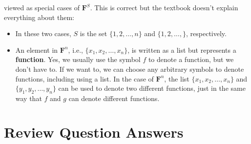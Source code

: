 \documentclass[12pt, letterpaper, oneside]{book}
\begin{document}
\begin{enumerate}
    viewed as special cases of $\mathbf{F}^S$. This is correct but the textbook
    doesn't explain everything about them:
    \begin{itemize}
      \item In these two cases, $S$ is the set $\{ 1, 2, \ldots, n \}$ and
      $\{ 1, 2, \ldots, \}$, respectively.
      \item An element in $\mathbf{F}^n$, i.e., $\{ x_1, x_2, \ldots, x_n \}$,
        is written as a list but represents a \textbf{function}. Yes, we
        usually use the symbol $f$ to denote a function, but we don't have to.
        If we want to, we can choose any arbitrary symbols to denote functions,
        including using a list. In the case of $\mathbf{F}^n$, the list
        $\{ x_1, x_2, \ldots, x_n \}$ and $\{ y_1, y_2, \ldots, y_n \}$ can be
        used to denote two different functions, just in the same way that $f$
        and $g$ can denote different functions.
    \end{itemize}
\end{enumerate}

\section{Review Question Answers}
\end{document}
